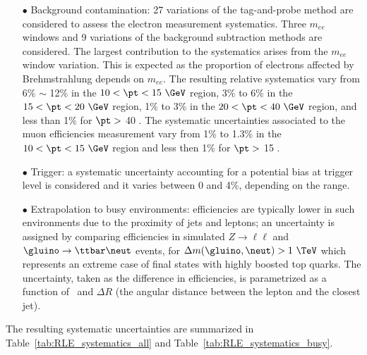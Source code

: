 \begin{itemize}
\item[$\bullet$] Background contamination: 27 variations of the tag-and-probe method are considered to assess the electron measurement systematics.
Three $m_{ee}$ windows and 9 variations of the background subtraction methods are considered.
The largest contribution to the systematics arises from the $m_{ee}$ window variation.
This is expected as the proportion of electrons affected by Brehmstrahlung depends on $m_{ee}$.
The resulting relative systematics vary from 6\% $\sim$ 12\% in the $10<\pt<15~\GeV$ region, 3\% to 6\% in the $15<\pt<20~\GeV$ region, 1\% to 3\% in the $20<\pt<40~\GeV$ region, and less than 1\% for $\pt >$ 40 \GeV.
The systematic uncertainties associated to the muon efficiencies measurement vary from 1\% to 1.3\% in the $10<\pt<15~\GeV$ region and less then 1\% for $\pt >$ 15 \GeV. 
\item[$\bullet$] Trigger: a systematic uncertainty accounting for a potential bias at trigger level is considered and it varies between 0 and 4\%, depending on the \pt range.
\item[$\bullet$] Extrapolation to busy environments: efficiencies are typically lower in such environments due to the proximity of jets and leptons; 
an uncertainty is assigned by comparing efficiencies in simulated $Z\to\ell\ell$ and $\gluino\to\ttbar\neut$ events, for $\Delta m(\gluino,\neut)>1~\TeV$ which represents an extreme case of final states with highly boosted top quarks. 
The uncertainty, taken as the difference in efficiencies, is parametrized as a function of \pt\ and $\Delta R$ (the angular distance between the lepton and the closest jet). 
\end{itemize}
The resulting systematic uncertainties are summarized in Table~\ref{tab:RLE_systematics_all} and Table~\ref{tab:RLE_systematics_busy}.


